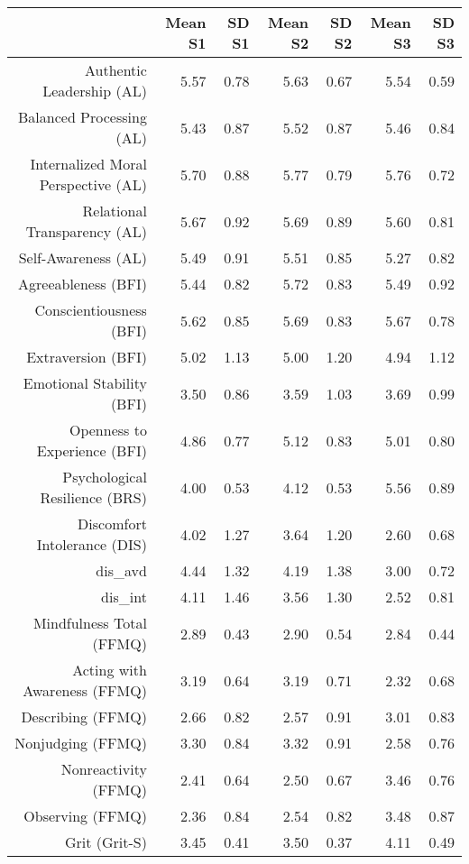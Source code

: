 \begin{table}[ht]
\centering
\begin{tabular}{rrrrrrr}
  \hline
 & Mean S1 & SD S1 & Mean S2 & SD S2 & Mean S3 & SD S3 \\ 
  \hline
Authentic Leadership (AL) & 5.57 & 0.78 & 5.63 & 0.67 & 5.54 & 0.59 \\ 
  Balanced Processing (AL) & 5.43 & 0.87 & 5.52 & 0.87 & 5.46 & 0.84 \\ 
  Internalized Moral Perspective (AL) & 5.70 & 0.88 & 5.77 & 0.79 & 5.76 & 0.72 \\ 
  Relational Transparency (AL) & 5.67 & 0.92 & 5.69 & 0.89 & 5.60 & 0.81 \\ 
  Self-Awareness (AL) & 5.49 & 0.91 & 5.51 & 0.85 & 5.27 & 0.82 \\ 
  Agreeableness (BFI) & 5.44 & 0.82 & 5.72 & 0.83 & 5.49 & 0.92 \\ 
  Conscientiousness (BFI) & 5.62 & 0.85 & 5.69 & 0.83 & 5.67 & 0.78 \\ 
  Extraversion (BFI) & 5.02 & 1.13 & 5.00 & 1.20 & 4.94 & 1.12 \\ 
  Emotional Stability (BFI) & 3.50 & 0.86 & 3.59 & 1.03 & 3.69 & 0.99 \\ 
  Openness to Experience (BFI) & 4.86 & 0.77 & 5.12 & 0.83 & 5.01 & 0.80 \\ 
  Psychological Resilience (BRS) & 4.00 & 0.53 & 4.12 & 0.53 & 5.56 & 0.89 \\ 
  Discomfort Intolerance (DIS) & 4.02 & 1.27 & 3.64 & 1.20 & 2.60 & 0.68 \\ 
  dis\_avd & 4.44 & 1.32 & 4.19 & 1.38 & 3.00 & 0.72 \\ 
  dis\_int & 4.11 & 1.46 & 3.56 & 1.30 & 2.52 & 0.81 \\ 
  Mindfulness Total (FFMQ) & 2.89 & 0.43 & 2.90 & 0.54 & 2.84 & 0.44 \\ 
  Acting with Awareness (FFMQ) & 3.19 & 0.64 & 3.19 & 0.71 & 2.32 & 0.68 \\ 
  Describing (FFMQ) & 2.66 & 0.82 & 2.57 & 0.91 & 3.01 & 0.83 \\ 
  Nonjudging (FFMQ) & 3.30 & 0.84 & 3.32 & 0.91 & 2.58 & 0.76 \\ 
  Nonreactivity (FFMQ) & 2.41 & 0.64 & 2.50 & 0.67 & 3.46 & 0.76 \\ 
  Observing (FFMQ) & 2.36 & 0.84 & 2.54 & 0.82 & 3.48 & 0.87 \\ 
  Grit (Grit-S) & 3.45 & 0.41 & 3.50 & 0.37 & 4.11 & 0.49 \\ 

\end{tabular}
\end{table}
